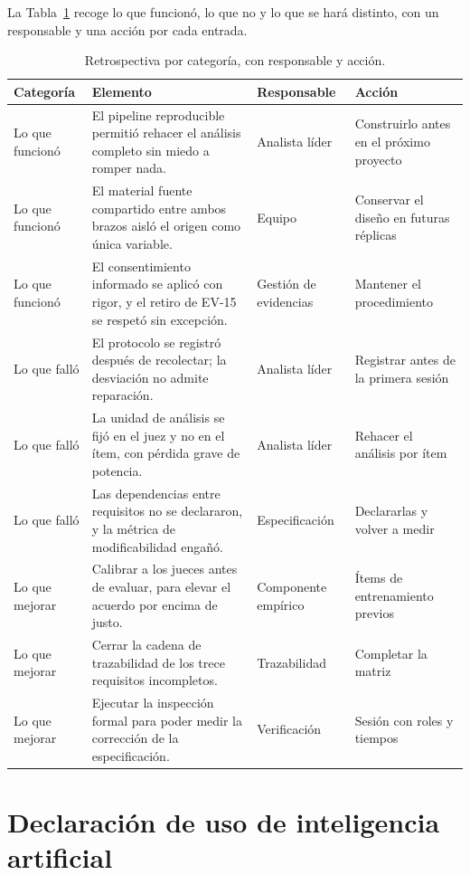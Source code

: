 \documentclass[11pt,a4paper]{article}
\begin{document}
La Tabla~\ref{tab:retrospectiva} recoge lo que funcion\'o, lo que no y lo que se har\'a distinto, con un responsable y una acci\'on por cada entrada.

\begin{table}[H]\centering\small
\caption{Retrospectiva por categor\'ia, con responsable y acci\'on.}
\label{tab:retrospectiva}
\begin{tabular}{p{2.4cm}p{6.6cm}p{2.6cm}p{2.6cm}}
\toprule
\textbf{Categor\'ia} & \textbf{Elemento} & \textbf{Responsable} & \textbf{Acci\'on} \\
\midrule
Lo que funcion\'o & El pipeline reproducible permiti\'o rehacer el an\'alisis completo sin miedo a romper nada. & Analista l\'ider & Construirlo antes en el pr\'oximo proyecto \\
Lo que funcion\'o & El material fuente compartido entre ambos brazos aisl\'o el origen como \'unica variable. & Equipo & Conservar el dise\~no en futuras r\'eplicas \\
Lo que funcion\'o & El consentimiento informado se aplic\'o con rigor, y el retiro de EV-15 se respet\'o sin excepci\'on. & Gesti\'on de evidencias & Mantener el procedimiento \\
Lo que fall\'o & El protocolo se registr\'o despu\'es de recolectar; la desviaci\'on no admite reparaci\'on. & Analista l\'ider & Registrar antes de la primera sesi\'on \\
Lo que fall\'o & La unidad de an\'alisis se fij\'o en el juez y no en el \'item, con p\'erdida grave de potencia. & Analista l\'ider & Rehacer el an\'alisis por \'item \\
Lo que fall\'o & Las dependencias entre requisitos no se declararon, y la m\'etrica de modificabilidad enga\~n\'o. & Especificaci\'on & Declararlas y volver a medir \\
Lo que mejorar & Calibrar a los jueces antes de evaluar, para elevar el acuerdo por encima de justo. & Componente emp\'irico & \'Items de entrenamiento previos \\
Lo que mejorar & Cerrar la cadena de trazabilidad de los trece requisitos incompletos. & Trazabilidad & Completar la matriz \\
Lo que mejorar & Ejecutar la inspecci\'on formal para poder medir la correcci\'on de la especificaci\'on. & Verificaci\'on & Sesi\'on con roles y tiempos \\
\bottomrule
\end{tabular}
\end{table}

\section{Declaraci\'on de uso de inteligencia artificial}
\label{anx:ia}
\end{document}
